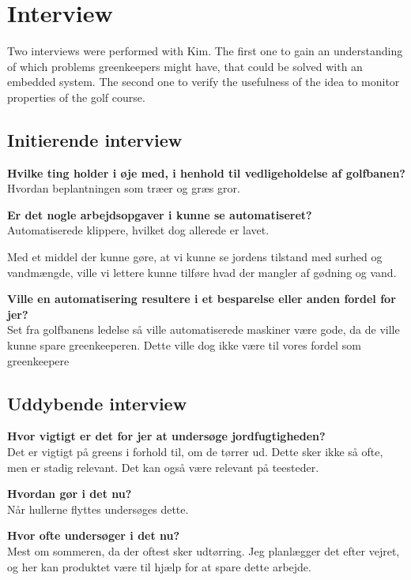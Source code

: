 \chapter{Interview} \label{cha:interviewKim}
Two interviews were performed with Kim. The first one to gain an understanding of which problems greenkeepers might have, that could be solved with an embedded system. The second one to verify the usefulness of the idea to monitor properties of the golf course.

\section*{Initierende interview}
\textbf{Hvilke ting holder i øje med, i henhold til vedligeholdelse af golfbanen?}\\
Hvordan beplantningen som træer og græs gror.

\textbf{Er det nogle arbejdsopgaver i kunne se automatiseret?}\\
Automatiserede klippere, hvilket dog allerede er lavet.

Med et middel der kunne gøre, at vi kunne se jordens tilstand med surhed og vandmængde, ville vi lettere kunne tilføre hvad der mangler af gødning og vand.

\textbf{Ville en automatisering resultere i et besparelse eller anden fordel for jer?}\\
Set fra golfbanens ledelse så ville automatiserede maskiner være gode, da de ville kunne spare greenkeeperen.
Dette ville dog ikke være til vores fordel som greenkeepere

\section*{Uddybende interview}

\textbf{Hvor vigtigt er det for jer at undersøge jordfugtigheden?}\\
Det er vigtigt på greens i forhold til, om de tørrer ud. Dette sker ikke så ofte, men er stadig relevant.
Det kan også være relevant på teesteder.

\textbf{Hvordan gør i det nu?}\\
Når hullerne flyttes undersøges dette.

\textbf{Hvor ofte undersøger i det nu?}\\
Mest om sommeren, da der oftest sker udtørring. Jeg planlægger det efter vejret, og her kan produktet være til hjælp for at spare dette arbejde.

